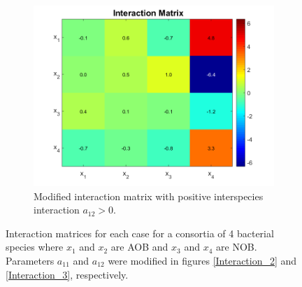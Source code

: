 \documentclass[processes,article,submit,moreauthors,pdftex]{Definitions/mdpi}
\begin{document}
\begin{figure}[h]
\begin{subfigure}[t]{0.32\textwidth}
		\includegraphics[width=\textwidth]{Stability/Interactions_parameters_modified_2}
		\caption{Modified interaction matrix with positive interspecies interaction  $a_{12}>0$.}
		\label{Interaction_3}
	\end{subfigure}
	\caption{Interaction matrices for each case for a consortia of 4 bacterial species where $x_1$ and $x_2$ are AOB and $x_3$ and $x_4$ are NOB. Parameters $a_{11}$ and $a_{12}$ were modified in figures \eqref{Interaction_2} and \eqref{Interaction_3}, respectively.}
	\label{Interactions}
\end{figure} 
\end{document}
